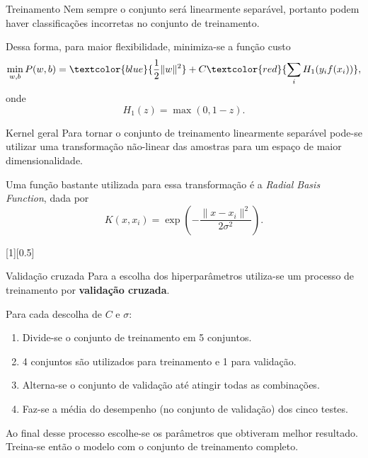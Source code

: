 	\begin{frame}{Treinamento}
		Nem sempre o conjunto será linearmente separável, portanto podem haver classificações incorretas no conjunto de treinamento.

		Dessa forma, para maior flexibilidade, minimiza-se a função custo
		\begin{equation}
			\label{eq:svm-cost}
			\min_{w,b} P(w,b) = \textcolor{blue}{\frac{1}{2}\|w\|^2} + C\textcolor{red}{\sum_i H_1(y_i f(x_i))},
		\end{equation}
		onde
		\begin{equation*}
		H_1(z)=\max(0,1-z).
		\end{equation*}
	\end{frame}

	\begin{frame}{Kernel geral}
		Para tornar o conjunto de treinamento linearmente separável pode-se utilizar uma transformação não-linear das amostras para um espaço de maior dimensionalidade.

		Uma função bastante utilizada para essa transformação é a \emph{Radial Basis Function}, dada por 
		\begin{equation}
			\label{eq:svm-kernel-func}
			K(x,x_i) = \exp\left(-\frac{\|x-x_i\|^2}{2\sigma^2}\right).
		\end{equation}

		[1][0.5]
	\end{frame}

	\begin{frame}{Validação cruzada}
		Para a escolha dos hiperparâmetros utiliza-se um processo de treinamento por \textbf{validação cruzada}. \pause
	
		Para cada descolha de $C$ e $\sigma$:
		\begin{enumerate}
			\item Divide-se o conjunto de treinamento em 5 conjuntos.
			\item 4 conjuntos são utilizados para treinamento e 1 para validação.
			\item Alterna-se o conjunto de validação até atingir todas as combinações.
			\item Faz-se a média do desempenho (no conjunto de validação) dos cinco testes.
		\end{enumerate} \pause

		Ao final desse processo escolhe-se os parâmetros que obtiveram melhor resultado. Treina-se então o modelo com o conjunto de treinamento completo.
	\end{frame}

